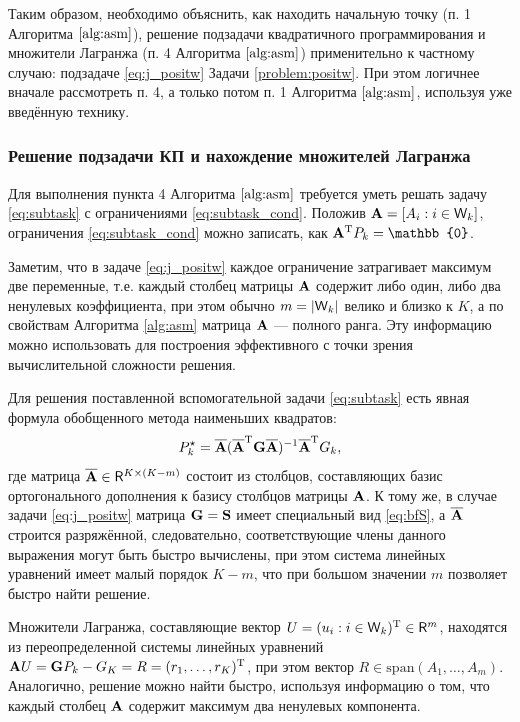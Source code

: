 \documentclass[10pt]{article}
\begin{document}
Таким образом, необходимо объяснить, как находить начальную точку (п. 1 Алгоритма $\ref{alg:asm}$), решение подзадачи квадратичного программирования и множители Лагранжа (п. 4 Алгоритма $\ref{alg:asm}$) применительно к частному случаю: подзадаче \eqref{eq:j_positw} Задачи \ref{problem:positw}. При этом логичнее вначале рассмотреть п. 4, а только потом п. 1 Алгоритма $\ref{alg:asm}$, используя уже введённую технику.


\subsubsection{Решение подзадачи КП и нахождение множителей Лагранжа}
Для выполнения пункта 4 Алгоритма $\ref{alg:asm}$ требуется уметь решать задачу \eqref{eq:subtask} с ограничениями \eqref{eq:subtask_cond}. Положив $\mathbf{A} = [A_i : i \in \mathsf{W}_k]$, ограничения \eqref{eq:subtask_cond} можно записать, как $\bfA^\rmT P_k = \mathbb{0}$.

Заметим, что в задаче \eqref{eq:j_positw} каждое ограничение затрагивает максимум две переменные, т.е. каждый столбец матрицы $\mathbf{A}$ содержит либо один, либо два ненулевых коэффициента, при этом обычно $m = |\mathsf{W}_k|$ велико и близко к $K$, а по свойствам Алгоритма \ref{alg:asm} матрица $\mathbf{A}$ --- полного ранга. Эту информацию можно использовать для построения эффективного с точки зрения вычислительной сложности решения.

Для решения поставленной вспомогательной задачи \eqref{eq:subtask} есть явная формула обобщенного метода наименьших квадратов:
\begin{equation*}
P_k^\star = \overline {\mathbf{A}} (\overline {\mathbf{A}}^{\mathrm{T}} \mathbf{G} \overline {\mathbf{A}})^{-1} \overline {\mathbf{A}}^{\mathrm{T}} G_k,
\end{equation*}
где матрица $\overline {\mathbf{A}} \in \mathsf{R}^{K \times (K-m)}$ состоит из столбцов, составляющих базис ортогонального дополнения к базису столбцов матрицы $\mathbf{A}$. К тому же, в случае задачи \eqref{eq:j_positw} матрица $\mathbf{G} = \mathbf{S}$ имеет специальный вид \eqref{eq:bfS}, а $\overline {\mathbf{A}}$ строится разряжённой, следовательно, соответствующие члены данного выражения могут быть быстро вычислены, при этом система линейных уравнений имеет малый порядок $K-m$, что при большом значении $m$ позволяет быстро найти решение.

Множители Лагранжа, составляющие вектор $U = (u_i : i \in \mathsf{W}_k)^{\mathrm{T}} \in \mathsf{R}^{m}$, находятся из переопределенной системы линейных уравнений $\mathbf{A} U =  \mathbf{G} P_k - G_K = R = (r_1, \ldots, r_K)^{\mathrm{T}}$, при этом вектор $R \in \text{span}(A_1, \ldots, A_m)$. Аналогично, решение можно найти быстро, используя информацию о том, что каждый столбец $\mathbf{A}$ содержит максимум два ненулевых компонента.
\end{document}
